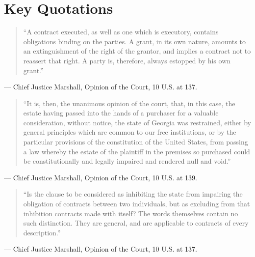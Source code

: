 \documentclass[12pt]{article}
\begin{document}
\section{Key Quotations}

\begin{quote}
``A contract executed, as well as one which is executory, contains obligations binding on the parties. A grant, in its own nature, amounts to an extinguishment of the right of the grantor, and implies a contract not to reassert that right. A party is, therefore, always estopped by his own grant.''
\end{quote}
\noindent --- Chief Justice Marshall, Opinion of the Court, 10 U.S. at 137.

\begin{quote}
``It is, then, the unanimous opinion of the court, that, in this case, the estate having passed into the hands of a purchaser for a valuable consideration, without notice, the state of Georgia was restrained, either by general principles which are common to our free institutions, or by the particular provisions of the constitution of the United States, from passing a law whereby the estate of the plaintiff in the premises so purchased could be constitutionally and legally impaired and rendered null and void.''
\end{quote}
\noindent --- Chief Justice Marshall, Opinion of the Court, 10 U.S. at 139.

\begin{quote}
``Is the clause to be considered as inhibiting the state from impairing the obligation of contracts between two individuals, but as excluding from that inhibition contracts made with itself? The words themselves contain no such distinction. They are general, and are applicable to contracts of every description.''
\end{quote}
\noindent --- Chief Justice Marshall, Opinion of the Court, 10 U.S. at 137.
\end{document}
